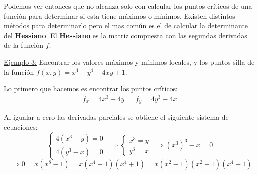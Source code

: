 \documentclass[12pt]{article}
\begin{document}
Podemos ver entonces que no alcanza solo con calcular los puntos críticos de una función para determinar si esta tiene máximos o mínimos. Existen distintos métodos para determinarlo pero el mas común es el de calcular la determinante del \textbf{Hessiano}. El \textbf{Hessiano} es la matriz compuesta con las segundas derivadas de la función $ f $.

\vspace{0.2cm}
\vspace{0.2cm}

\underline{Ejemplo 3:} Encontrar los valores máximos y mínimos locales, y los puntos silla de la función $ f(x,y)=x^4+y^4-4xy+1 $.

Lo primero que hacemos es encontrar los puntos críticos:
\begin{align*}
  f_{x} = 4x^3-4y && f_{y}=4y^3-4x
\end{align*}

Al igualar a cero las derivadas parciales se obtiene el siguiente sistema de ecuaciones:
\[
\begin{cases}
  4(x^3-y) = 0\\
  4(y^3-x) = 0
\end{cases} \implies \begin{cases}
  x^3=y\\
  y^3=x 
\end{cases} \implies (x^3)^3 - x = 0  
\]
\[
  \implies 0=x(x^8-1)=x(x^4-1)(x^4+1)=x(x^2-1)(x^2+1)(x^4+1)
\]
\end{document}
